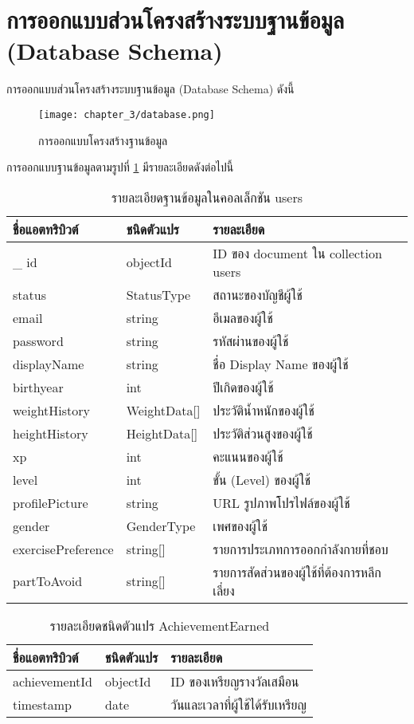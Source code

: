 \section{การออกแบบส่วนโครงสร้างระบบฐานข้อมูล (Database Schema)}
การออกแบบส่วนโครงสร้างระบบฐานข้อมูล (Database Schema) ดังนี้
\begin{figure}
    \texttt{[image: chapter\_3/database.png]}
    \caption{การออกแบบโครงสร้างฐานข้อมูล}
    \label{fig:db-schema}
\end{figure}
\clearpage
การออกแบบฐานข้อมูลตามรูปที่ \ref{fig:db-schema} มีรายละเอียดดังต่อไปนี้

\begin{table}
    \caption{รายละเอียดฐานข้อมูลในคอลเล็กชัน users}
    \begin{tabularx}{\textwidth}{ | l | l | X | }
        \hline
        \bf ชื่อแอตทริบิวต์ & \bf ชนิดตัวแปร & \bf รายละเอียด \\\hline
        \_ id & objectId & ID ของ document ใน collection users\\\hline
        status & StatusType & สถานะของบัญชีผู้ใช้\\\hline
        email & string & อีเมลของผู้ใช้\\\hline
        password & string & รหัสผ่านของผู้ใช้\\\hline
        displayName & string & ชื่อ Display Name ของผู้ใช้\\\hline
        birthyear & int & ปีเกิดของผู้ใช้\\\hline
        weightHistory & WeightData[] & ประวัติน้ำหนักของผู้ใช้\\\hline
        heightHistory & HeightData[] & ประวัติส่วนสูงของผู้ใช้\\\hline
        xp & int & คะแนนของผู้ใช้\\\hline
        level & int & ขั้น (Level) ของผู้ใช้\\\hline
        profilePicture & string & URL รูปภาพโปรไฟล์ของผู้ใช้\\\hline
        gender & GenderType & เพศของผู้ใช้\\\hline
        exercisePreference & string[] & รายการประเภทการออกกำลังกายที่ชอบ\\\hline
        partToAvoid & string[] & รายการสัดส่วนของผู้ใช้ที่ต้องการหลีกเลี่ยง\\\hline
    \end{tabularx}
\end{table}

\begin{table}
    \caption{รายละเอียดชนิดตัวแปร AchievementEarned}
    \begin{tabularx}{\textwidth}{ | l | l | X | }
        \hline
        \bf ชื่อแอตทริบิวต์ & \bf ชนิดตัวแปร & \bf รายละเอียด \\\hline
        achievementId & objectId & ID ของเหรียญรางวัลเสมือน\\\hline
        timestamp & date & วันและเวลาที่ผู้ใช้ได้รับเหรียญ\\\hline 
    \end{tabularx}
\end{table}

